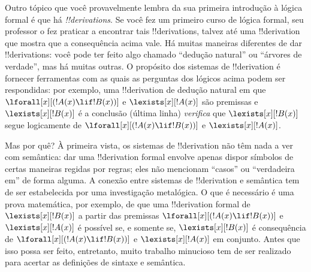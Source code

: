 \documentclass[../../../include/open-logic-section]{subfiles}
\begin{document}
Outro tópico que você provavelmente lembra da sua primeira introdução
à lógica formal é que há \emph{!!{derivation}s}.  Se você fez um
primeiro curso de lógica formal, seu professor o fez praticar a
encontrar tais !!{derivation}s, talvez até uma !!{derivation} que
mostra que a consequência acima vale.  Há muitas maneiras diferentes
de dar !!{derivation}s: você pode ter feito algo chamado ``dedução
natural'' ou ``árvores de verdade'', mas há muitas outras. O propósito
dos sistemas de !!{derivation} é fornecer ferramentas com as quais as
perguntas dos lógicos acima podem ser respondidas: por exemplo, uma
!!{derivation} de dedução natural em que $\lforall[x][(!A(x) \lif !B(x))]$
e $\lexists[x][!A(x)]$ são premissas e $\lexists[x][!B(x)]$ é a
conclusão (última linha) \emph{verifica} que $\lexists[x][!B(x)]$
segue logicamente de $\lforall[x][(!A(x) \lif !B(x))]$ e
$\lexists[x][!A(x)]$.  

Mas por quê?  À primeira vista, os sistemas de !!{derivation} não têm
nada a ver com semântica: dar uma !!{derivation} formal envolve
apenas dispor símbolos de certas maneiras regidas por regras; eles não
mencionam ``casos'' ou ``verdadeira em'' de forma alguma.  A conexão
entre sistemas de !!{derivation} e semântica tem de ser estabelecida por
uma investigação metalógica. O que é necessário é uma prova
matemática, por exemplo, de que uma !!{derivation} formal de
$\lexists[x][!B(x)]$ a partir das premissas $\lforall[x][(!A(x) \lif
!B(x))]$ e $\lexists[x][!A(x)]$ é possível se, e somente se,
$\lexists[x][!B(x)]$ é consequência de $\lforall[x][(!A(x) \lif !B(x))]$
e $\lexists[x][!A(x)]$ em conjunto.  Antes que isso possa ser feito,
entretanto, muito trabalho minucioso tem de ser realizado para acertar
as definições de sintaxe e semântica.
\end{document}
